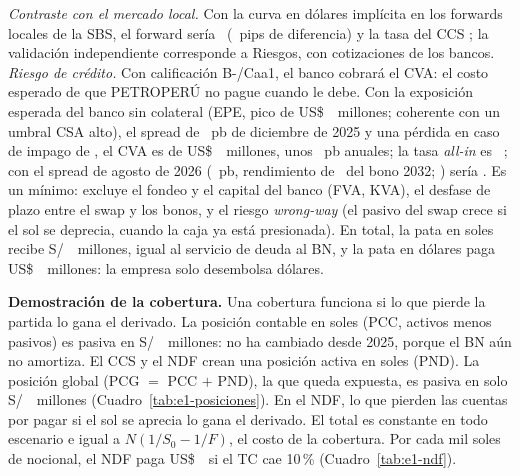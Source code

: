 \emph{Contraste con el mercado local.} Con la curva en dólares implícita en los forwards locales de la SBS, el forward
sería \NDFForwardSBS\ (\NDFDifSBSPips~pips de diferencia) y la tasa del CCS \CCSTasaSBS; la validación independiente
corresponde a Riesgos, con cotizaciones de los bancos. \emph{Riesgo de crédito.} Con calificación B-/Caa1, el banco cobrará
el CVA: el costo esperado de que PETROPERÚ no pague cuando le debe. Con la exposición esperada del banco sin
colateral (EPE, pico de US\$~\CCSEPEMax\ millones; coherente con un umbral CSA alto), el spread de \SpreadBonosPb~pb de diciembre de 2025 y una pérdida en caso de impago de
\LGD, el CVA es de US\$~\CCSCVAUSD\ millones, unos \CCSCVApb~pb anuales; la tasa \emph{all-in} es \CCSTasaAllIn\
\parencite{hull2022}; con el spread de agosto de 2026 (\SpreadProxyPb~pb, rendimiento de \YTMBonoAgo\ del bono
2032; \cite{debtwire2026petroperu}) sería \CCSTasaAllInProxy. Es un mínimo: excluye el fondeo y el capital del banco
(FVA, KVA), el desfase de plazo entre el swap y los bonos, y el riesgo \emph{wrong-way} (el pasivo del swap crece si
el sol se deprecia, cuando la caja ya está presionada). En total, la pata en soles recibe S/~\CCSTotalPEN\ millones, igual al servicio de deuda al
BN, y la pata en dólares paga US\$~\CCSTotalUSD\ millones: la empresa solo desembolsa dólares.

\textbf{Demostración de la cobertura.} Una cobertura funciona si lo que pierde la partida lo gana el derivado. La
posición contable en soles (PCC, activos menos pasivos) es pasiva en S/~\PosicionHoy\ millones: no ha cambiado desde
2025, porque el BN aún no amortiza. El CCS y el NDF crean una posición activa en soles (PND). La posición global
(PCG $=$ PCC $+$ PND), la que queda expuesta, es pasiva en solo S/~\ResiduoTotal\ millones
(Cuadro~\ref{tab:e1-posiciones}). En el NDF, lo que pierden las cuentas por pagar si el sol se aprecia lo gana el
derivado. El total es constante en todo escenario e igual a $N(1/S_0-1/F)$, el costo de la cobertura. Por cada
mil soles de nocional, el NDF paga US\$~\NDFPorMilMenosDiez\ si el TC cae 10\,\% (Cuadro~\ref{tab:e1-ndf}).

\medskip\noindent
\begin{minipage}[t]{0.42\linewidth}\footnotesize\setlength{\tabcolsep}{2.5pt}\end{minipage}\hfill
\begin{minipage}[t]{0.56\linewidth}\footnotesize\setlength{\tabcolsep}{2.5pt}\end{minipage}
\medskip

